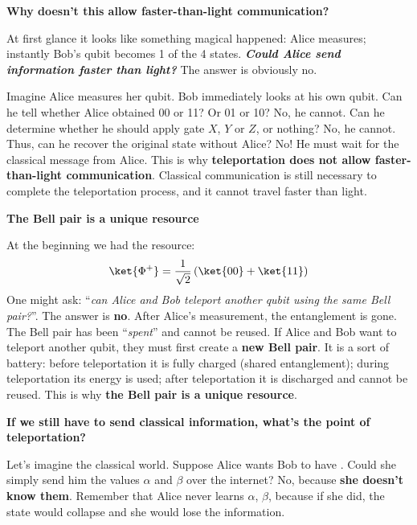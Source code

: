 \highspace
\begin{flushleft}
    \textcolor{Green3}{ \textbf{Why doesn't this allow faster-than-light communication?}}
\end{flushleft}
At first glance it looks like something magical happened: Alice measures; instantly Bob's qubit becomes 1 of the 4 states. \emph{\textbf{Could Alice send information faster than light?}} The answer is obviously no.

\highspace
Imagine Alice measures her qubit. Bob immediately looks at his own qubit. Can he tell whether Alice obtained 00 or 11? Or 01 or 10? No, he cannot. Can he determine whether he should apply gate $X$, $Y$ or $Z$, or nothing? No, he cannot. Thus, can he recover the original state \ket{\psi} without Alice? No! He must wait for the classical message from Alice. This is why \textbf{teleportation does not allow faster-than-light communication}. Classical communication is still necessary to complete the teleportation process, and it cannot travel faster than light.

\highspace
\begin{flushleft}
    \textcolor{Red2}{ \textbf{The Bell pair is a unique resource}}
\end{flushleft}
At the beginning we had the resource:
\begin{equation*}
    \ket{\Phi^+} = \frac{1}{\sqrt{2}}\left(\ket{00} + \ket{11}\right)
\end{equation*}
One might ask: ``\emph{can Alice and Bob teleport another qubit using the same Bell pair?}''. The answer is \textbf{no}. After Alice's measurement, the entanglement is gone. The Bell pair has been ``\emph{spent}'' and cannot be reused. If Alice and Bob want to teleport another qubit, they must first create a \textbf{new Bell pair}. It is a sort of battery: before teleportation it is fully charged (shared entanglement); during teleportation its energy is used; after teleportation it is discharged and cannot be reused. This is why \textbf{the Bell pair is a unique resource}.

\highspace
\begin{flushleft}
    \textcolor{Green3}{ \textbf{If we still have to send classical information, what's the point of teleportation?}}
\end{flushleft}
Let's imagine the classical world. Suppose Alice wants Bob to have \ket{\psi}. Could she simply send him the values $\alpha$ and $\beta$ over the internet? No, because \textbf{she doesn't know them}. Remember that Alice never learns $\alpha$, $\beta$, because if she did, the state would collapse and she would lose the information.

